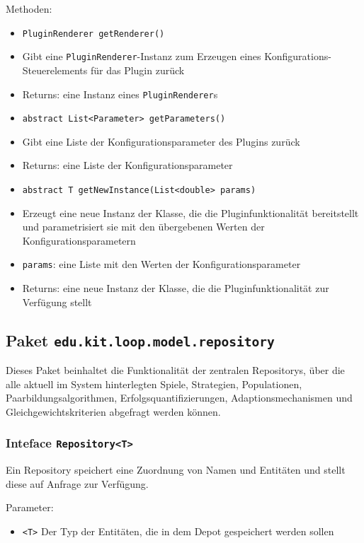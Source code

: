 \documentclass[parskip=full,11pt]{scrartcl}
\begin{document}
Methoden:
\begin{itemize}\itemsep -10pt
	\item \texttt{PluginRenderer getRenderer()}
	\item[] Gibt eine \texttt{PluginRenderer}-Instanz zum Erzeugen eines Konfigurations-Steuerelements für das Plugin zurück
	\item[] Returns: eine Instanz eines \texttt{PluginRenderer}s
	\item \texttt{abstract List<Parameter> getParameters()}
	\item[] Gibt eine Liste der Konfigurationsparameter des Plugins zurück
	\item[] Returns: eine Liste der Konfigurationsparameter
	\item \texttt{abstract T getNewInstance(List<double> params)}
	\item[] Erzeugt eine neue Instanz der Klasse, die die Pluginfunktionalität bereitstellt und parametrisiert sie mit den übergebenen Werten der Konfigurationsparametern
	\item[] \texttt{params}: eine Liste mit den Werten der Konfigurationsparameter
	\item[] Returns: eine neue Instanz der Klasse, die die Pluginfunktionalität zur Verfügung stellt
\end{itemize}

\subsection{Paket \texttt{edu.kit.loop.model.repository}}
Dieses Paket beinhaltet die Funktionalität der zentralen Repositorys, über die alle aktuell im System hinterlegten Spiele, Strategien, Populationen, Paarbildungsalgorithmen, Erfolgsquantifizierungen, Adaptionsmechanismen und Gleichgewichtskriterien abgefragt werden können.


\subsubsection{Inteface \texttt{Repository<T>}}

Ein Repository speichert eine Zuordnung von Namen und Entitäten und stellt diese auf Anfrage zur Verfügung.

Parameter:
\begin{itemize}\itemsep -10pt
	\item \texttt{<T>} Der Typ der Entitäten, die in dem Depot gespeichert werden sollen
\end{itemize}
\end{document}
